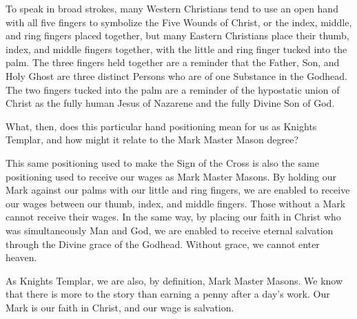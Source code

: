 \documentclass[letterpaper,11pt]{article}
\begin{document}
	To speak in broad strokes, many Western Christians tend to use an open hand with all five fingers to symbolize the Five Wounds of Christ, or the index, middle, and ring fingers placed together, but many Eastern Christians place their thumb, index, and middle fingers together, with the little and ring finger tucked into the palm. The three fingers held together are a reminder that the Father, Son, and Holy Ghost are three distinct Persons who are of one Substance in the Godhead. The two fingers tucked into the palm are a reminder of the hypostatic union of Christ as the fully human Jesus of Nazarene and the fully Divine Son of God.
	
	What, then, does this particular hand positioning mean for us as Knights Templar, and how might it relate to the Mark Master Mason degree?
	
	This same positioning used to make the Sign of the Cross is also the same positioning used to receive our wages as Mark Master Masons. By holding our Mark against our palms with our little and ring fingers, we are enabled to receive our wages between our thumb, index, and middle fingers. Those without a Mark cannot receive their wages. In the same way, by placing our faith in Christ who was simultaneously Man and God, we are enabled to receive eternal salvation through the Divine grace of the Godhead. Without grace, we cannot enter heaven.
	
	As Knights Templar, we are also, by definition, Mark Master Masons. We know that there is more to the story than earning a penny after a day's work. Our Mark is our faith in Christ, and our wage is salvation.
	
\end{document}
